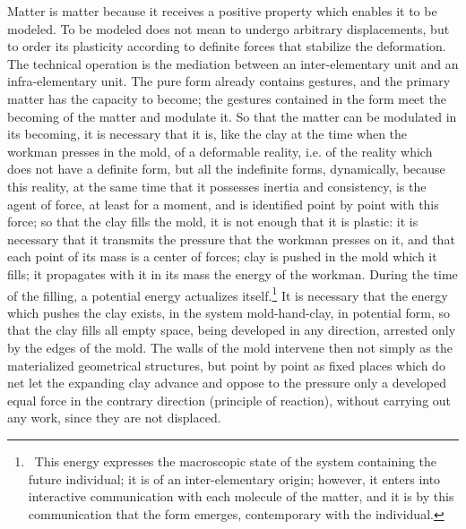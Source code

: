\documentclass[a4paper]{article}
\begin{document}
Matter is matter because it receives a positive property which enables it to be modeled. To be modeled does not mean to undergo arbitrary displacements, but to order its plasticity according to definite forces that stabilize the deformation. The technical operation is the mediation between an inter-elementary unit and an infra-elementary unit. The pure form already contains gestures, and the primary matter has the capacity to become; the gestures contained in the form meet the becoming of the matter and modulate it. So that the matter can be modulated in its becoming, it is necessary that it is, like the clay at the time when the workman presses in the mold, of a deformable reality, i.e. of the reality which does not have a definite form, but all the indefinite forms, dynamically, because this reality, at the same time that it possesses inertia and consistency, is the agent of force, at least for a moment, and is identified point by point with this force; so that the clay fills the mold, it is not enough that it is plastic: it is necessary that it transmits the pressure that the workman presses on it, and that each point of its mass is a center of forces; clay is pushed in the mold which it fills; it propagates with it in its mass the energy of the workman. During the time of the filling, a potential energy actualizes itself.\footnote{\ This energy expresses the macroscopic state of the system containing the future individual; it is of an inter-elementary origin; however, it enters into interactive communication with each molecule of the matter, and it is by this communication that the form emerges, contemporary with the individual.} It is necessary that the energy which pushes the clay exists, in the system mold-hand-clay, in potential form, so that the clay fills all empty space, being developed in any direction, arrested only by the edges of the mold. The walls of the mold intervene then not simply as the materialized geometrical structures, but point by point as fixed places which do net let the expanding clay advance and oppose to the pressure only a developed equal force in the contrary direction (principle of reaction), without carrying out any work, since they are not displaced.
\end{document}
